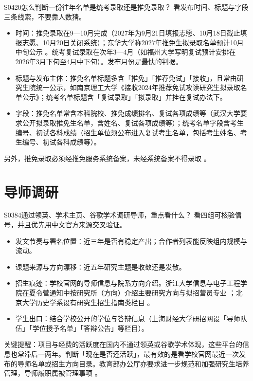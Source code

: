 \begin{qa}{S0420}{怎么判断一份往年名单是统考录取还是推免录取？}
看发布时间、标题与字段三条线索，不要靠人数猜。
\begin{itemize}
  \item 时间：推免录取在9—10月完成（2027年为9月21日填报志愿、10月18日截止填报志愿、10月20日关闭系统）；东华大学称2027年推免生拟录取名单预计10月中旬公示 。统考复试录取在次年3—4月（如福州大学写明复试预计安排在2026年3月下旬至4月中下旬）。发布月份是最快的判据。
  \item 标题与发布主体：推免名单标题多含「推免」「推荐免试」「接收」，且常由研究生院统一公示，如南京理工大学《接收2024年推荐免试攻读研究生拟录取名单公示》；统考名单标题含「复试录取」「拟录取」并挂在复试办法下。
  \item 字段：推免名单常含本科院校、推免成绩排名、复试各项成绩等（武汉大学要求公开拟录取推免生名单，含姓名、复试各项成绩等）；统考名单字段含考生编号、初试各科成绩（招生单位须公布进入复试考生名单，包括考生姓名、考生编号、初试各科成绩等）。
\end{itemize}
另外，推免录取必须经推免服务系统备案，未经系统备案不得录取 。
\end{qa}

\section{导师调研}
\begin{qa}{S0384}{通过领英、学术主页、谷歌学术调研导师，重点看什么？}
看四组可核验信号，并且优先用中文官方来源交叉验证。
\begin{itemize}
  \item 发文节奏与署名位置：近三年是否有稳定产出；合作者列表能反映组内规模与流动。
  \item 课题来源与方向漂移：近五年研究主题是收敛还是发散。
  \item 招生痕迹：学校官网的导师信息与院系方向介绍。浙江大学信息与电子工程学院在夏令营通知中按研究所（方向）介绍主要研究方向与拟招营员专业 ；北京大学历史学系设有研究生招生指南类栏目 。
  \item 学生出口：结合学校公开的学位与答辩信息（上海财经大学研招网设「导师队伍」「学位授予名单」「答辩公告」等栏目）。
\end{itemize}
关键提醒：项目与经费的活跃度在国内不通过领英或谷歌学术体现，这些平台的信息也常滞后一两年。判断「现在是否还活跃」，最有效的是看学校官网最近一次发布的导师名单或招生方向目录。教育部办公厅亦要求进一步规范和加强研究生培养管理，导师履职属被管理事项 。
\end{qa}

